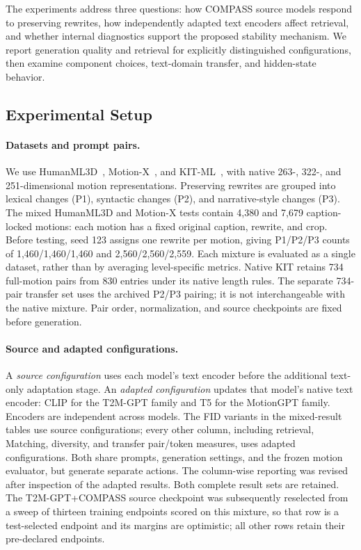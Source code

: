 \label{sec:experiments}
The experiments address three questions: how COMPASS source models respond to
preserving rewrites, how independently adapted text encoders affect retrieval,
and whether internal diagnostics support the proposed stability mechanism.
We report generation quality and retrieval for explicitly distinguished
configurations, then examine component choices, text-domain transfer, and
hidden-state behavior.

\subsection{Experimental Setup}
\label{sec:independent_adaptation}
\label{sec:detail_protocol_details}

\paragraph{Datasets and prompt pairs.}
We use HumanML3D~\cite{guo2022generating}, Motion-X~\cite{lin2023motionx}, and
KIT-ML~\cite{plappert2016kit}, with native 263-, 322-, and 251-dimensional
motion representations. Preserving rewrites are grouped into lexical changes
(P1), syntactic changes (P2), and narrative-style changes (P3). The mixed
HumanML3D and Motion-X tests contain 4,380 and 7,679 caption-locked motions:
each motion has a fixed original caption, rewrite, and crop. Before testing,
seed 123 assigns one rewrite per motion, giving P1/P2/P3 counts of
1,460/1,460/1,460 and 2,560/2,560/2,559. Each mixture is evaluated as a
single dataset, rather than by averaging level-specific metrics.
Native KIT retains 734 full-motion pairs from 830 entries under its native
length rules. The separate 734-pair transfer set uses the archived P2/P3
pairing; it is not interchangeable with the native mixture. Pair order,
normalization, and source checkpoints are fixed before generation.

\paragraph{Source and adapted configurations.}
A \emph{source configuration} uses each model's text encoder before the
additional text-only adaptation stage. An \emph{adapted configuration} updates
that model's native text encoder: CLIP for the T2M-GPT family and T5 for the
MotionGPT family. Encoders are independent across models. The FID variants in
the mixed-result tables use source configurations; every other column,
including retrieval, Matching, diversity, and transfer pair/token measures,
uses adapted configurations. Both share prompts, generation settings, and the
frozen motion evaluator, but generate separate actions. The column-wise
reporting was revised after inspection of the adapted results. Both complete
result sets are retained. The T2M-GPT+COMPASS source checkpoint was
subsequently reselected from a sweep of thirteen training endpoints scored on
this mixture, so that row is a test-selected endpoint and its margins are
optimistic; all other rows retain their pre-declared endpoints.

